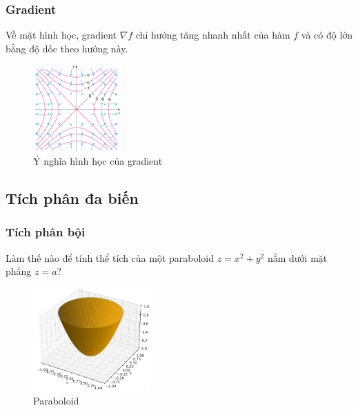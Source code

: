 \begin{frame}
\frametitle{Gradient}
Về mặt hình học, gradient \(\nabla f\) chỉ hướng tăng nhanh nhất của hàm \(f\) và có độ lớn bằng độ dốc theo hướng này.
\begin{figure}
    \centering
    \includegraphics[width=0.3\textwidth]{Content/Figure/gradient.png}
    \caption{Ý nghĩa hình học của gradient}
\end{figure}
\end{frame}

\subsection{Tích phân đa biến}
\begin{frame}
\frametitle{Tích phân bội}
Làm thế nào để tính thể tích của một paraboloid \(z=x^2+y^2\) nằm dưới mặt phẳng \(z=a\)?
\begin{figure}
    \centering
    \includegraphics[width=0.4\textwidth]{Content/Figure/paraboloid.png}
    \caption{Paraboloid}
\end{figure}
\end{frame}

